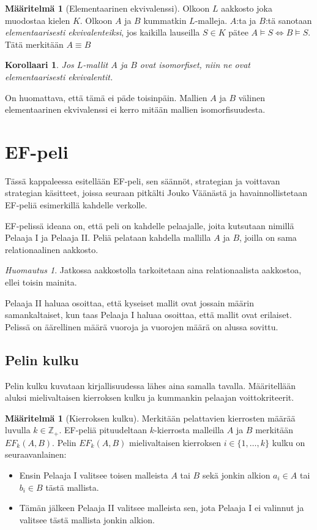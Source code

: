 \documentclass[finnish]{tktltiki2}
\newtheorem{kor}[lau]{Korollaari}
\theoremstyle{definition}
\newtheorem{maar}[lau]{Määritelmä}
\theoremstyle{remark}
\newtheorem*{huom}{Huomautus}
\begin{document}
\begin{maar}[Elementaarinen ekvivalenssi]
Olkoon $L$ aakkosto joka muodostaa kielen $K$. Olkoon $A$ ja $B$ kummatkin $L$-malleja. $A$:ta ja $B$:tä sanotaan \textit{elementaarisesti ekvivalenteiksi}, jos kaikilla lauseilla $S \in K$ pätee $A \models S \Longleftrightarrow B \models S$. Tätä merkitään $A \equiv B$
\end{maar}

\begin{kor}
Jos $L$-mallit $A$ ja $B$ ovat isomorfiset, niin ne ovat elementaarisesti ekvivalentit.
\end{kor}

On huomattava, että tämä ei päde toisinpäin. Mallien $A$ ja $B$ välinen elementaarinen ekvivalenssi ei kerro mitään mallien isomorfisuudesta. 

\section{EF-peli}
Tässä kappaleessa esitellään EF-peli, sen säännöt, strategian ja voittavan strategian käsitteet, joissa seuraan pitkälti Jouko Väänästä \cite{Vaa11} ja havainnollistetaan EF-peliä esimerkillä kahdelle verkolle.

EF-pelissä ideana on, että peli on kahdelle pelaajalle, joita kutsutaan nimillä Pelaaja I ja Pelaaja II. Peliä pelataan kahdella mallilla $A$ ja $B$, joilla on sama relationaalinen aakkosto. \begin{huom}
Jatkossa aakkostolla tarkoitetaan aina relationaalista aakkostoa, ellei toisin mainita.
\end{huom} Pelaaja II haluaa osoittaa, että kyseiset mallit ovat jossain määrin samankaltaiset, kun taas Pelaaja I haluaa osoittaa, että mallit ovat erilaiset. Pelissä on äärellinen määrä vuoroja ja vuorojen määrä on alussa sovittu.

\subsection{Pelin kulku}
Pelin kulku kuvataan kirjallisuudessa lähes aina samalla tavalla. Määritellään aluksi mielivaltaisen kierroksen kulku ja kummankin pelaajan voittokriteerit.

\begin{maar}[Kierroksen kulku]
Merkitään pelattavien kierrosten määrää luvulla $k \in \mathbb{Z}_+$. EF-peliä pituudeltaan $k$-kierrosta malleilla $A$ ja $B$ merkitään $EF_k(A, B)$. Pelin $EF_k(A, B)$ mielivaltaisen kierroksen $i \in \{1, \ldots, k\}$ kulku on seuraavanlainen: 
\begin{itemize}
\item Ensin Pelaaja I valitsee toisen malleista $A$ tai $B$ sekä jonkin alkion $a_i \in A$ tai $b_i \in B$ tästä mallista.
\item Tämän jälkeen Pelaaja II valitsee malleista sen, jota Pelaaja I ei valinnut ja valitsee tästä mallista jonkin alkion.
\end{itemize}
\end{maar}
\end{document}
